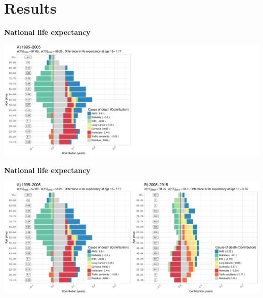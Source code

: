 \documentclass[xcolor={dvipsnames}]{beamer}
\begin{document}
\section{Results}

\begin{frame}
\begin{center}
\Large{\textbf{National life expectancy}}
\end{center}

\hspace*{-1cm}   
\includegraphics[scale=.31]{Figures/Figure_1_2}

\end{frame}


\begin{frame}
\begin{center}
\Large{\textbf{National life expectancy}}
\end{center}

\hspace*{-1cm}   
\includegraphics[scale=.31]{Figures/Figure_1}

\end{frame}
\end{document}

